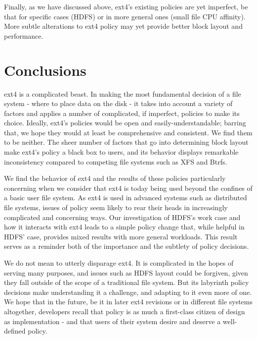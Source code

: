 \documentclass{acm_proc_article-sp}
\begin{document}
Finally, as we have discussed above, ext4's existing policies are yet imperfect, be that for specific cases (HDFS) or in more general ones (small file CPU affinity).  More subtle alterations to ext4 policy may yet provide better block layout and performance.

\section{Conclusions}
\label{sec:Conclusions}
ext4 is a complicated beast.  In making the most fundamental decision of a file system - where to place data on the disk - it takes into account a variety of factors and applies a number of complicated, if imperfect, policies to make its choice.  Ideally, ext4's policies would be open and easily-understandable; barring that, we hope they would at least be comprehensive and consistent.  We find them to be neither.  The sheer number of factors that go into determining block layout make ext4's policy a black box to users, and its behavior displays remarkable inconsistency compared to competing file systems such as XFS and Btrfs.
 
We find the behavior of ext4 and the results of these policies particularly concerning when we consider that ext4 is today being used beyond the confines of a basic user file system.  As ext4 is used in advanced systems such as distributed file systems, issues of policy seem likely to rear their heads in increasingly complicated and concerning ways.  Our investigation of HDFS's work case and how it interacts with ext4 leads to a simple policy change that, while helpful in HDFS' case, provides mixed results with more general workloads.  This result serves as a reminder both of the importance and the subtlety of policy decisions.
 
We do not mean to utterly disparage ext4.  It is complicated in the hopes of serving many purposes, and issues such as HDFS layout could be forgiven, given they fall outside of the scope of a traditional file system.  But its labyrinth policy decisions make understanding it a challenge, and adapting to it even more of one.  We hope that in the future, be it in later ext4 revisions or in different file systems altogether, developers recall that policy is as much a first-class citizen of design as implementation - and that users of their system desire and deserve a well-defined policy.


%

%
%
\end{document}

